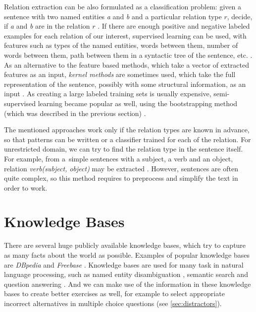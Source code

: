 \documentclass[12pt, twoside]{fithesis2}
\renewcommand{\_}{\leavevmode \kern0.07em\vbox{\hrule width0.4em}}
\newcounter{choice}
\begin{document}

Relation extraction can be also formulated as a classification problem:
given a sentence with two named entities \emph{a} and \emph{b} and a particular relation type $r$,
decide, if \emph{a} and \emph{b} are in the relation $r$ \cite{rel-extract-review}.
If there are enough positive and negative labeled examples for each relation of our interest,
supervised learning can be used, with features such as
types of the named entities, words between them,
number of words between them, path between them in a syntactic tree of the sentence, etc.
\cite{rel-extract-feature-based}.
As an alternative to the feature based methods, which take a vector of extracted features as an input,
\emph{kernel methods} are sometimes used, which take the full representation of the sentence, possibly with some structural information, as an input \cite{rel-extract-kernel}.
As creating a large labeled training sets is usually expensive, semi-supervised learning became popular as well,
using the bootstrapping method (which was described in the previous section) \cite{rel-extract-bootstrapping}.

The mentioned approaches work only if the relation types are known in advance,
so that patterns can be written or a classifier trained for each of the relation.
For unrestricted domain,
we can try to find the relation type in the sentence itself.
For example, from a~simple sentences with a subject, a verb and an object,
relation \emph{verb(subject, object)} may be extracted \cite{triples-acquisition}.
However, sentences are often quite complex, so this method requires to preprocess and simplify the text in order to work.

\section{Knowledge Bases}
\label{sec:knowledge-bases}

There are several huge publicly available knowledge bases,
which try to capture as many facts about the world as possible.
Examples of popular knowledge bases are
\textit{DBpedia} \cite{dbpedia}
and \textit{Freebase} \cite{freebase}.
Knowledge bases are used for many task in natural language processing,
such as
named entity disambiguation \cite{dbpedia-spotlight},
semantic search and question answering \cite{watson}.
And we can make use of the information in these knowledge bases to create better exercises as well,
for example to select appropriate incorrect alternatives in multiple choice questions
(see \autoref{sec:distractors}).
\end{document}
